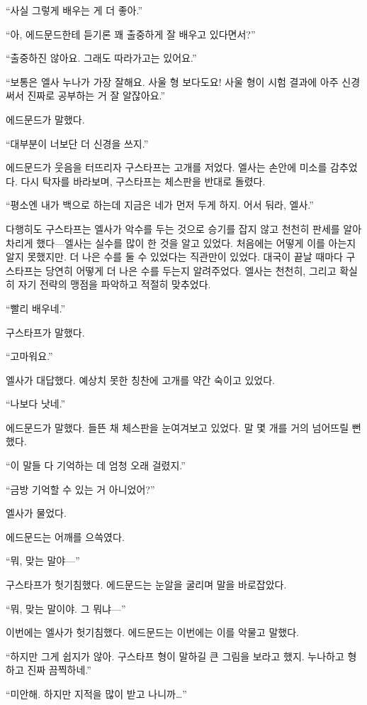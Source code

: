 ``사실 그렇게 배우는 게 더 좋아.''

``아, 에드문드한테 듣기론 꽤 출중하게 잘 배우고 있다면서?''

``출중하진 않아요. 그래도 따라가고는 있어요.''

``보통은 엘사 누나가 가장 잘해요. 사울 형 보다도요! 사울 형이 시험 결과에 아주 신경 써서 진짜로 공부하는 거 잘 알잖아요.''

에드문드가 말했다.

``대부분이 너보단 더 신경을 쓰지.''

에드문드가 웃음을 터뜨리자 구스타프는 고개를 저었다. 엘사는 손안에 미소를 감추었다. 다시 탁자를 바라보며, 구스타프는 체스판을 반대로 돌렸다.

``평소엔 내가 백으로 하는데 지금은 네가 먼저 두게 하지. 어서 둬라, 엘사.''

다행히도 구스타프는 엘사가 악수를 두는 것으로 승기를 잡지 않고 천천히 판세를 알아차리게 했다—엘사는 실수를 많이 한 것을 알고 있었다. 처음에는 어떻게 이를 아는지 알지 못했지만. 더 나은 수를 둘 수 있었다는 직관만이 있었다. 대국이 끝날 때마다 구스타프는 당연히 어떻게 더 나은 수를 두는지 알려주었다. 엘사는 천천히, 그리고 확실히 자기 전략의 맹점을 파악하고 적절히 맞추었다.

``빨리 배우네.''

구스타프가 말했다.

``고마워요.''

엘사가 대답했다. 예상치 못한 칭찬에 고개를 약간 숙이고 있었다.

``나보다 낫네.''

에드문드가 말했다. 들뜬 채 체스판을 눈여겨보고 있었다. 말 몇 개를 거의 넘어뜨릴 뻔했다.

``이 말들 다 기억하는 데 엄청 오래 걸렸지.''

``금방 기억할 수 있는 거 아니었어?''

엘사가 물었다.

에드문드는 어깨를 으쓱였다.

``뭐, 맞는 말야—''

구스타프가 헛기침했다. 에드문드는 눈알을 굴리며 말을 바로잡았다.

``뭐, 맞는 말이야. 그 뭐냐—''

이번에는 엘사가 헛기침했다. 에드문드는 이번에는 이를 악물고 말했다.

``하지만 그게 쉽지가 않아. 구스타프 형이 말하길 큰 그림을 보라고 했지. 누나하고 형하고 진짜 끔찍하네.''

``미안해. 하지만 지적을 많이 받고 나니까\ldots''

